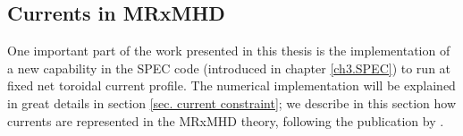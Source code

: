 \documentclass[my_thesis.tex]{subfiles}
\begin{document}


\subsection{Currents in MRxMHD}\label{ch2.mrxmhd_currents}



One important part of the work presented in this thesis is the implementation of a new capability in the SPEC code (introduced in chapter \ref{ch3.SPEC}) to run at fixed net toroidal current profile. The numerical implementation will be explained in great details in section \ref{sec. current constraint}; we describe in this section how currents are represented in the MRxMHD theory, following the publication by \citet{Baillod2021}.
\end{document}
